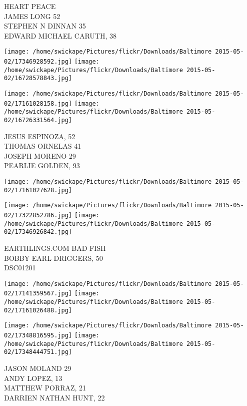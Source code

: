 \documentclass[10pt,letterpaper]{article}
\begin{document}
HEART PEACE\\
JAMES LONG 52\\
STEPHEN N DINNAN 35\\
EDWARD MICHAEL CARUTH, 38\\
\pagebreak

\texttt{[image: /home/swickape/Pictures/flickr/Downloads/Baltimore 2015-05-02/17346928592.jpg]}
\texttt{[image: /home/swickape/Pictures/flickr/Downloads/Baltimore 2015-05-02/16728578843.jpg]}

\texttt{[image: /home/swickape/Pictures/flickr/Downloads/Baltimore 2015-05-02/17161028158.jpg]}
\texttt{[image: /home/swickape/Pictures/flickr/Downloads/Baltimore 2015-05-02/16726331564.jpg]}

JESUS ESPINOZA, 52\\
THOMAS ORNELAS 41\\
JOSEPH MORENO 29\\
PEARLIE GOLDEN, 93\\
\pagebreak

\texttt{[image: /home/swickape/Pictures/flickr/Downloads/Baltimore 2015-05-02/17161027628.jpg]}

\vspace{0.25in}
\texttt{[image: /home/swickape/Pictures/flickr/Downloads/Baltimore 2015-05-02/17322852786.jpg]}
\texttt{[image: /home/swickape/Pictures/flickr/Downloads/Baltimore 2015-05-02/17346926842.jpg]}

EARTHLINGS.COM BAD FISH\\
BOBBY EARL DRIGGERS, 50\\
DSC01201\\
\pagebreak

\texttt{[image: /home/swickape/Pictures/flickr/Downloads/Baltimore 2015-05-02/17141359567.jpg]}
\texttt{[image: /home/swickape/Pictures/flickr/Downloads/Baltimore 2015-05-02/17161026488.jpg]}

\texttt{[image: /home/swickape/Pictures/flickr/Downloads/Baltimore 2015-05-02/17348816595.jpg]}
\texttt{[image: /home/swickape/Pictures/flickr/Downloads/Baltimore 2015-05-02/17348444751.jpg]}

JASON MOLAND 29\\
ANDY LOPEZ, 13\\
MATTHEW PORRAZ, 21\\
DARRIEN NATHAN HUNT, 22\\
\pagebreak
\end{document}
